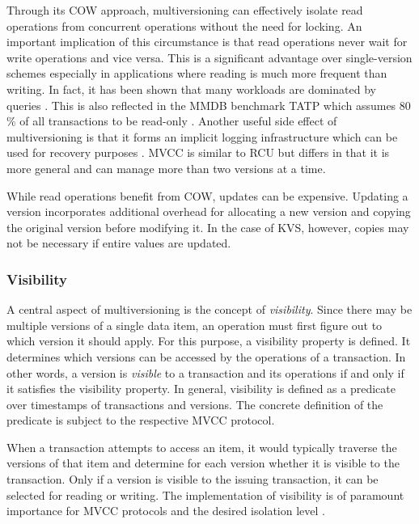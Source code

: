 Through its \ac{COW} approach, multiversioning can effectively isolate read
operations from concurrent operations without the need for locking. An important
implication of this circumstance is that read operations never wait for write
operations and vice versa. This is a significant advantage over single-version
schemes especially in applications where reading is much more frequent than
writing. In fact, it has been shown that many workloads are dominated by queries
\cite{krueger2011fast, andrei2017sap}. This is also reflected in the \ac{MMDB}
benchmark TATP which assumes 80 \% of all transactions to be read-only
\cite{larson2011high}. Another useful side effect of multiversioning is that it
forms an implicit logging infrastructure which can be used for recovery
purposes \cite{condit2009better, venkataraman2011consistent}. \ac{MVCC} is
similar to \ac{RCU} \cite{mckenney1998read} but differs in that it is more
general and can manage more than two versions at a time.

While read operations benefit from \ac{COW}, updates can be expensive.
Updating a version incorporates additional overhead for allocating a new version
and copying the original version before modifying it. In the case of \ac{KVS},
however, copies may not be necessary if entire values are updated.

\subsubsection{Visibility}

A central aspect of multiversioning is the concept of \emph{visibility}. Since
there may be multiple versions of a single data item, an operation must first
figure out to which version it should apply. For this purpose, a visibility
property is defined. It determines which versions can be accessed by the
operations of a transaction. In other words, a version is \emph{visible} to a
transaction and its operations if and only if it satisfies the visibility
property. In general, visibility is defined as a predicate over timestamps of
transactions and versions. The concrete definition of the predicate is subject
to the respective \ac{MVCC} protocol.

When a transaction attempts to access an item, it would typically traverse
the versions of that item and determine for each version whether it is visible
to the transaction. Only if a version is visible to the issuing transaction, it
can be selected for reading or writing. The implementation of visibility is of
paramount importance for \ac{MVCC} protocols and the desired isolation level
\cite{larson2011high}.

